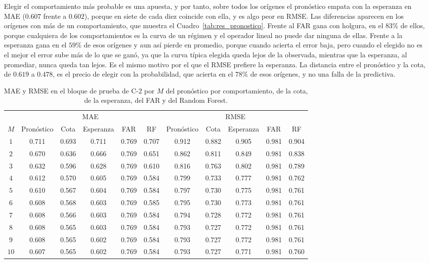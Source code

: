 Elegir el comportamiento más probable es una apuesta, y por tanto, sobre todos los orígenes el pronóstico empata con la esperanza en MAE ($0.607$ frente a $0.602$), porque en siete de cada diez coincide con ella, y es algo peor en RMSE. Las diferencias aparecen en los orígenes con más de un comportamiento, que muestra el Cuadro~\ref{tab:res_pronostico}. Frente al FAR gana con holgura, en el $83\%$ de ellos, porque cualquiera de los comportamientos es la curva de un régimen y el operador lineal no puede dar ninguna de ellas. Frente a la esperanza gana en el $59\%$ de esos orígenes y aun así pierde en promedio, porque cuando acierta el error baja, pero cuando el elegido no es el mejor el error sube más de lo que se ganó, ya que la curva típica elegida queda lejos de la observada, mientras que la esperanza, al promediar, nunca queda tan lejos. Es el mismo motivo por el que el RMSE prefiere la esperanza. La distancia entre el pronóstico y la cota, de $0.619$ a $0.478$, es el precio de elegir con la probabilidad, que acierta en el $78\%$ de esos orígenes, y no una falla de la predictiva.\\

\begin{table}[H]
\centering\footnotesize
\setlength{\tabcolsep}{3pt}
\caption{MAE y RMSE en el bloque de prueba de C-2 por $M$ del pronóstico por comportamiento, de la cota, de la esperanza, del FAR y del Random Forest.}
\label{tab:res_pronostico_por_M}
\begin{tabular}{c ccccc ccccc}
\hline
 & \multicolumn{5}{c}{MAE} & \multicolumn{5}{c}{RMSE} \\
$M$ & Pronóstico & Cota & Esperanza & FAR & RF & Pronóstico & Cota & Esperanza & FAR & RF \\
\hline
$1$ & 0.711 & 0.693 & 0.711 & 0.769 & 0.707 & 0.912 & 0.882 & 0.905 & 0.981 & 0.904 \\
$2$ & 0.670 & 0.636 & 0.666 & 0.769 & 0.651 & 0.862 & 0.811 & 0.849 & 0.981 & 0.838 \\
$3$ & 0.632 & 0.596 & 0.628 & 0.769 & 0.610 & 0.816 & 0.763 & 0.802 & 0.981 & 0.789 \\
$4$ & 0.612 & 0.570 & 0.605 & 0.769 & 0.584 & 0.799 & 0.733 & 0.777 & 0.981 & 0.762 \\
$5$ & 0.610 & 0.567 & 0.604 & 0.769 & 0.584 & 0.797 & 0.730 & 0.775 & 0.981 & 0.761 \\
$6$ & 0.608 & 0.568 & 0.603 & 0.769 & 0.585 & 0.795 & 0.730 & 0.773 & 0.981 & 0.761 \\
$7$ & 0.608 & 0.566 & 0.603 & 0.769 & 0.584 & 0.794 & 0.728 & 0.772 & 0.981 & 0.761 \\
$8$ & 0.608 & 0.565 & 0.603 & 0.769 & 0.584 & 0.793 & 0.727 & 0.772 & 0.981 & 0.761 \\
$9$ & 0.608 & 0.565 & 0.602 & 0.769 & 0.584 & 0.793 & 0.727 & 0.772 & 0.981 & 0.761 \\
$10$ & 0.607 & 0.565 & 0.602 & 0.769 & 0.584 & 0.793 & 0.727 & 0.771 & 0.981 & 0.760 \\
\hline
\end{tabular}
\end{table}


